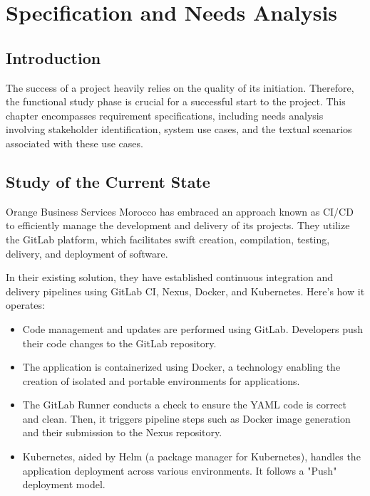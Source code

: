 \chapter{Specification and Needs Analysis}
\label{chap:Chapter 2 title}
\section{Introduction}


The success of a project heavily relies on the quality of its initiation. Therefore, the functional study phase is crucial for a successful start to the project. This chapter encompasses requirement specifications, including needs analysis involving stakeholder identification, system use cases, and the textual scenarios associated with these use cases.

\pagebreak

\section{Study of the Current State}

Orange Business Services Morocco has embraced an approach known as CI/CD to efficiently manage the development and delivery of its projects. They utilize the GitLab platform, which facilitates swift creation, compilation, testing, delivery, and deployment of software.

In their existing solution, they have established continuous integration and delivery pipelines using GitLab CI, Nexus, Docker, and Kubernetes. Here's how it operates:

\begin{itemize}
  \item Code management and updates are performed using GitLab. Developers push their code changes to the GitLab repository.
  \item The application is containerized using Docker, a technology enabling the creation of isolated and portable environments for applications.
  \item The GitLab Runner conducts a check to ensure the YAML code is correct and clean. Then, it triggers pipeline steps such as Docker image generation and their submission to the Nexus repository.
  \item Kubernetes, aided by Helm (a package manager for Kubernetes), handles the application deployment across various environments. It follows a "Push" deployment model.
\end{itemize}

